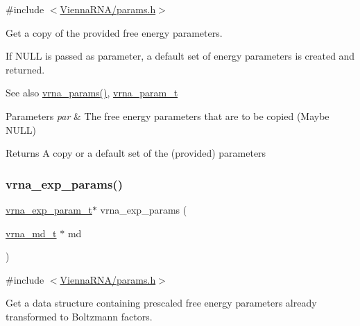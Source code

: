{\ttfamily \#include $<$\hyperlink{params_8h}{Vienna\+R\+N\+A/params.\+h}$>$}



Get a copy of the provided free energy parameters. 

If N\+U\+LL is passed as parameter, a default set of energy parameters is created and returned.

\begin{DoxySeeAlso}{See also}
\hyperlink{group__energy__parameters_gad0e3e7e74bdc50d1709d40c92993185e}{vrna\+\_\+params()}, \hyperlink{group__energy__parameters_ga8a69ca7d787e4fd6079914f5343a1f35}{vrna\+\_\+param\+\_\+t}
\end{DoxySeeAlso}

\begin{DoxyParams}{Parameters}
{\em par} & The free energy parameters that are to be copied (Maybe N\+U\+LL) \\
\hline
\end{DoxyParams}
\begin{DoxyReturn}{Returns}
A copy or a default set of the (provided) parameters 
\end{DoxyReturn}
\mbox{\label{group__energy__parameters_gab1f3016f96aa96bff020cdd904605afa}} 
\subsubsection{\texorpdfstring{vrna\+\_\+exp\+\_\+params()}{vrna\_exp\_params()}}
{\footnotesize\ttfamily \hyperlink{group__energy__parameters_ga01d8b92fe734df8d79a6169482c7d8d8}{vrna\+\_\+exp\+\_\+param\+\_\+t}$\ast$ vrna\+\_\+exp\+\_\+params (\begin{DoxyParamCaption}\item[{\hyperlink{group__model__details_ga1f8a10e12a0a1915f2a4eff0b28ea17c}{vrna\+\_\+md\+\_\+t} $\ast$}]{md }\end{DoxyParamCaption})}



{\ttfamily \#include $<$\hyperlink{params_8h}{Vienna\+R\+N\+A/params.\+h}$>$}



Get a data structure containing prescaled free energy parameters already transformed to Boltzmann factors. 

